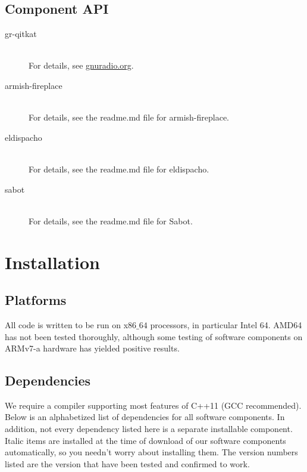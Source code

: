 \documentclass[letterpaper,twoside=false]{scrbook}
\begin{document}
	\section{Component API}
		\begin{description}
			\item[gr-qitkat] \hfill \\
			For details, see \url{gnuradio.org}.
			
			\item[armish-fireplace] \hfill \\
			For details, see the readme.md file for armish-fireplace.
			
			\item[eldispacho] \hfill \\
			For details, see the readme.md file for eldispacho.
			
			\item[sabot] \hfill \\
			For details, see the readme.md file for Sabot.
		\end{description}

\chapter{Installation}
	\section{Platforms}
	
	All code is written to be run on x$86\_64$ processors, in particular Intel 64. AMD64 has not been tested thoroughly, although some testing of software components on ARMv7-a hardware has yielded positive results.

	\section{Dependencies}

		 We require a compiler supporting most features of C++11 (GCC recommended). Below is an alphabetized list of dependencies for all software components. In addition, not every dependency listed here is a separate installable component. Italic items are installed at the time of download of our software components automatically, so you needn't worry about installing them. The version numbers listed are the version that have been tested and confirmed to work.
\end{document}
